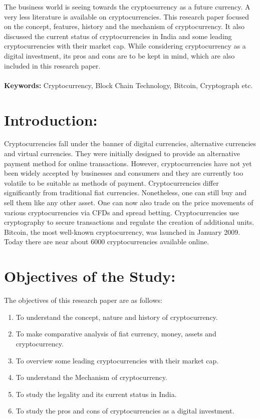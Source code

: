 \documentclass[11pt]{article}
\begin{document}
\setcounter{page}{71}


\begin{tcolorbox}[colback=light gray, colframe=black, title=Abstract, sharp corners=south]
The business world is seeing towards the cryptocurrency as a future currency. A very less literature is available on cryptocurrencies. This research paper focused on the concept, features, history and the mechanism of cryptocurrency. It also discussed the current status of cryptocurrencies in India and some leading cryptocurrencies with their market cap. While considering cryptocurrency as a digital investment, its pros and cons are to be kept in mind, which are also included in this research paper.  
\\
\\
\textbf{Keywords:} Cryptocurrency, Block Chain Technology, Bitcoin, Cryptograph etc.
\end{tcolorbox}

\section*{Introduction:}
Cryptocurrencies fall under the banner of digital currencies, alternative currencies and virtual currencies. They were initially designed to provide an alternative payment method for online transactions. However, cryptocurrencies have not yet been widely accepted by businesses and consumers and they are currently too volatile to be suitable as methods of payment. Cryptocurrencies differ significantly from traditional fiat currencies. Nonetheless, one can still buy and sell them like any other asset. One can now also trade on the price movements of various cryptocurrencies via CFDs and spread betting. Cryptocurrencies use cryptography to secure transactions and regulate the creation of additional units. Bitcoin, the most well-known cryptocurrency, was launched in January 2009. Today there are near about 6000 cryptocurrencies available online.

\section*{Objectives of the Study:}
The objectives of this research paper are as follows:
\begin{enumerate}
    \item To understand the concept, nature and history of cryptocurrency.
    \item To make comparative analysis of fiat currency, money, assets and cryptocurrency.
    \item To overview some leading cryptocurrencies with their market cap.
    \item To understand the Mechanism of cryptocurrency.
    \item To study the legality and its current status in India.
    \item To study the pros and cons of cryptocurrencies as a digital investment.
\end{enumerate}
\end{document}
